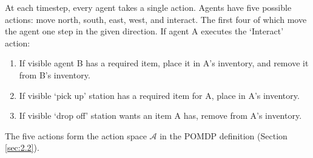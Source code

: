 At each timestep, every agent takes a single action.
Agents have five possible actions: move north, south, east, west, and interact.
The first four of which move the agent one step in the given direction.
If agent A executes the `Interact' action:
\begin{enumerate}[noitemsep, topsep=0pt]
    \item If visible agent B has a required item, place it in A's inventory, and remove it from B's inventory.
    \item If visible `pick up' station has a required item for A, place in A's inventory.
    \item If visible `drop off' station wants an item A has, remove from A's inventory.
\end{enumerate}
The five actions form the action space $\mathcal{A}$ in the POMDP definition (Section \ref{sec:2.2}).

